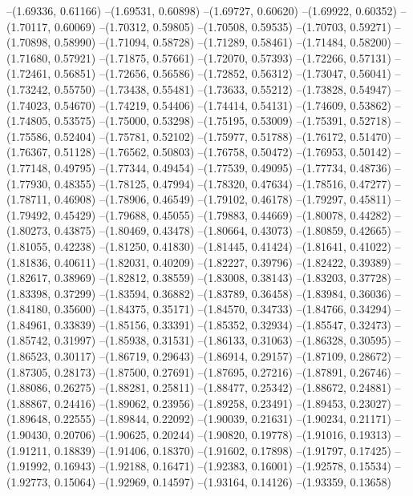 --(1.69336, 0.61166)
--(1.69531, 0.60898)
--(1.69727, 0.60620)
--(1.69922, 0.60352)
--(1.70117, 0.60069)
--(1.70312, 0.59805)
--(1.70508, 0.59535)
--(1.70703, 0.59271)
--(1.70898, 0.58990)
--(1.71094, 0.58728)
--(1.71289, 0.58461)
--(1.71484, 0.58200)
--(1.71680, 0.57921)
--(1.71875, 0.57661)
--(1.72070, 0.57393)
--(1.72266, 0.57131)
--(1.72461, 0.56851)
--(1.72656, 0.56586)
--(1.72852, 0.56312)
--(1.73047, 0.56041)
--(1.73242, 0.55750)
--(1.73438, 0.55481)
--(1.73633, 0.55212)
--(1.73828, 0.54947)
--(1.74023, 0.54670)
--(1.74219, 0.54406)
--(1.74414, 0.54131)
--(1.74609, 0.53862)
--(1.74805, 0.53575)
--(1.75000, 0.53298)
--(1.75195, 0.53009)
--(1.75391, 0.52718)
--(1.75586, 0.52404)
--(1.75781, 0.52102)
--(1.75977, 0.51788)
--(1.76172, 0.51470)
--(1.76367, 0.51128)
--(1.76562, 0.50803)
--(1.76758, 0.50472)
--(1.76953, 0.50142)
--(1.77148, 0.49795)
--(1.77344, 0.49454)
--(1.77539, 0.49095)
--(1.77734, 0.48736)
--(1.77930, 0.48355)
--(1.78125, 0.47994)
--(1.78320, 0.47634)
--(1.78516, 0.47277)
--(1.78711, 0.46908)
--(1.78906, 0.46549)
--(1.79102, 0.46178)
--(1.79297, 0.45811)
--(1.79492, 0.45429)
--(1.79688, 0.45055)
--(1.79883, 0.44669)
--(1.80078, 0.44282)
--(1.80273, 0.43875)
--(1.80469, 0.43478)
--(1.80664, 0.43073)
--(1.80859, 0.42665)
--(1.81055, 0.42238)
--(1.81250, 0.41830)
--(1.81445, 0.41424)
--(1.81641, 0.41022)
--(1.81836, 0.40611)
--(1.82031, 0.40209)
--(1.82227, 0.39796)
--(1.82422, 0.39389)
--(1.82617, 0.38969)
--(1.82812, 0.38559)
--(1.83008, 0.38143)
--(1.83203, 0.37728)
--(1.83398, 0.37299)
--(1.83594, 0.36882)
--(1.83789, 0.36458)
--(1.83984, 0.36036)
--(1.84180, 0.35600)
--(1.84375, 0.35171)
--(1.84570, 0.34733)
--(1.84766, 0.34294)
--(1.84961, 0.33839)
--(1.85156, 0.33391)
--(1.85352, 0.32934)
--(1.85547, 0.32473)
--(1.85742, 0.31997)
--(1.85938, 0.31531)
--(1.86133, 0.31063)
--(1.86328, 0.30595)
--(1.86523, 0.30117)
--(1.86719, 0.29643)
--(1.86914, 0.29157)
--(1.87109, 0.28672)
--(1.87305, 0.28173)
--(1.87500, 0.27691)
--(1.87695, 0.27216)
--(1.87891, 0.26746)
--(1.88086, 0.26275)
--(1.88281, 0.25811)
--(1.88477, 0.25342)
--(1.88672, 0.24881)
--(1.88867, 0.24416)
--(1.89062, 0.23956)
--(1.89258, 0.23491)
--(1.89453, 0.23027)
--(1.89648, 0.22555)
--(1.89844, 0.22092)
--(1.90039, 0.21631)
--(1.90234, 0.21171)
--(1.90430, 0.20706)
--(1.90625, 0.20244)
--(1.90820, 0.19778)
--(1.91016, 0.19313)
--(1.91211, 0.18839)
--(1.91406, 0.18370)
--(1.91602, 0.17898)
--(1.91797, 0.17425)
--(1.91992, 0.16943)
--(1.92188, 0.16471)
--(1.92383, 0.16001)
--(1.92578, 0.15534)
--(1.92773, 0.15064)
--(1.92969, 0.14597)
--(1.93164, 0.14126)
--(1.93359, 0.13658)

